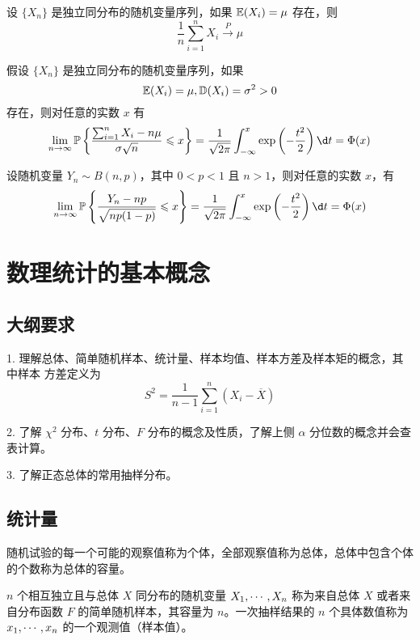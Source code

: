 \begin{theorem}[辛钦大数定律]
	设 $\{X_n\}$ 是独立同分布的随机变量序列，如果 $\mathbb{E}(X_i) = \mu$ 存在，则
	\[ \frac{1}{n} \sum_{i=1}^n X_i \stackrel{P}{\longrightarrow} \mu \]
\end{theorem}

\begin{theorem}[列维 - 林德伯格定理]
	假设 $\{X_n\}$ 是独立同分布的随机变量序列，如果
	\[ \mathbb{E}(X_i) = \mu, \mathbb{D}(X_i) = \sigma^2 > 0 \]
	存在，则对任意的实数 $x$ 有
	\[ \lim_{n \to \infty} \bbP\left\{ \frac{\sum_{i=1}^n X_i - n \mu}{\sigma \sqrt{n}} \leqslant x \right\} = \frac{1}{\sqrt{2 \pi}} \int_{-\infty}^x \exp\left(-\frac{t^2}{2}\right) \d t = \Phi(x)  \]
\end{theorem}

\begin{theorem}
	设随机变量 $Y_n \sim B(n, p)$，其中 $0 < p < 1$ 且 $n > 1$，则对任意的实数 $x$，有
	\[ \lim_{n \to \infty} \bbP\left\{ \frac{Y_n - np}{\sqrt{np(1 - p)}} \leqslant x \right\} = \frac{1}{\sqrt{2 \pi}} \int_{-\infty}^x \exp\left(-\frac{t^2}{2}\right) \d t = \Phi(x)  \]
\end{theorem}


\section{数理统计的基本概念}

\subsection{大纲要求}

1. 理解总体、简单随机样本、统计量、样本均值、样本方差及样本矩的概念，其中样本
方差定义为
\[ S^2 = \frac{1}{n-1} \sum_{i=1}^n (X_i - \overline{X}) \]

2. 了解 $\chi^2$ 分布、$t$ 分布、$F$ 分布的概念及性质，了解上侧 $\alpha$ 分位数的概念并会查表计算。

3. 了解正态总体的常用抽样分布。

\subsection{统计量}

随机试验的每一个可能的观察值称为个体，全部观察值称为总体，总体中包含个体的个数称为总体的容量。

$n$ 个相互独立且与总体 $X$ 同分布的随机变量 $X_1,\cdots,X_n$ 称为来自总体 $X$ 或者来自分布函数 $F$ 的简单随机样本，其容量为 $n$。一次抽样结果的 $n$ 个具体数值称为 $x_1,\cdots,x_n$ 的一个观测值（样本值）。

